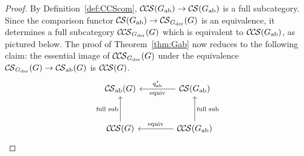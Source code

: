 \documentclass[10pt]{amsart}
\theoremstyle{plain}
\theoremstyle{definition}
\newcommand{\der}{_{\operatorname{der}}}
\newcommand{\ab}{_{\operatorname{ab}}}
\newcommand{\CS}{{\mathcal{C\hskip-0.8pt S}}}
\newcommand{\CCS}{{\mathcal{C\hskip-.8pt C\hskip-0.8pt S}}}
\newcommand{\CSab}{\CS_{\operatorname{ab}}}
\begin{document}
\begin{proof}
By Definition~\ref{def:CCScom}, $\CCS(G\ab) \to \CS(G\ab)$ is a full subcategory.
Since the comparison functor $\CS(G\ab) \to \CS_{G\der}(G)$ is an equivalence, it determines a full subcategory $\CCS_{G\der}(G)$ which is equivalent to $\CCS(G\ab)$, as pictured below.
The proof of Theorem~\ref{thm:Gab} now reduces to the following claim: the essential image of $\CCS_{G\der}(G)$ under the equivalence $\CS_{G\der}(G) \to \CSab(G)$ is $\CCS(G)$.
\[
\begin{tikzcd}[row sep=30, column sep=40]
\CSab(G) & \CS(G\ab) \arrow{l}{\text{equiv}}[swap]{q\ab^*} \\
\CCS(G) \arrow{u}{\text{full sub}} & \CCS(G\ab) \arrow{u}[swap]{\text{full sub}} \arrow{l}[swap]{\text{equiv}}
\end{tikzcd}
\]


\end{proof}
\end{document}
